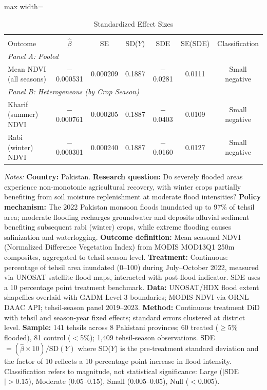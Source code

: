 \begin{table}[htbp]
\centering
\caption{Standardized Effect Sizes}
\label{tab:sde}
\begin{adjustbox}{max width=\textwidth}
\begin{tabular}{lcccccc}
\hline\hline
\\[-1.8ex]
Outcome & $\hat{\beta}$ & SE & SD($Y$) & SDE & SE(SDE) & Classification \\
\hline
\multicolumn{7}{l}{\textit{Panel A: Pooled}} \\
Mean NDVI (all seasons) & $-$0.000531 & 0.000209 & 0.1887 & $-$0.0281 & 0.0111 & Small negative \\
\hline
\multicolumn{7}{l}{\textit{Panel B: Heterogeneous (by Crop Season)}} \\
Kharif (summer) NDVI & $-$0.000761 & 0.000205 & 0.1887 & $-$0.0403 & 0.0109 & Small negative \\
Rabi (winter) NDVI & $-$0.000301 & 0.000240 & 0.1887 & $-$0.0160 & 0.0127 & Small negative \\
\hline\hline
\end{tabular}
\end{adjustbox}
\par\vspace{0.3em}
\footnotesize
\textit{Notes:} \textbf{Country:} Pakistan. \textbf{Research question:} Do severely flooded areas experience non-monotonic agricultural recovery, with winter crops partially benefiting from soil moisture replenishment at moderate flood intensities? \textbf{Policy mechanism:} The 2022 Pakistan monsoon floods inundated up to 97\% of tehsil area; moderate flooding recharges groundwater and deposits alluvial sediment benefiting subsequent rabi (winter) crops, while extreme flooding causes salinization and waterlogging. \textbf{Outcome definition:} Mean seasonal NDVI (Normalized Difference Vegetation Index) from MODIS MOD13Q1 250m composites, aggregated to tehsil-season level. \textbf{Treatment:} Continuous: percentage of tehsil area inundated (0--100) during July--October 2022, measured via UNOSAT satellite flood maps, interacted with post-flood indicator. SDE uses a 10 percentage point treatment benchmark. \textbf{Data:} UNOSAT/HDX flood extent shapefiles overlaid with GADM Level 3 boundaries; MODIS NDVI via ORNL DAAC API; tehsil-season panel 2019--2023. \textbf{Method:} Continuous treatment DiD with tehsil and season-year fixed effects; standard errors clustered at district level. \textbf{Sample:} 141 tehsils across 8 Pakistani provinces; 60 treated ($\geq$5\% flooded), 81 control ($<$5\%); 1,409 tehsil-season observations. SDE $= (\hat{\beta} \times 10) / \text{SD}(Y)$ where SD($Y$) is the pre-treatment standard deviation and the factor of 10 reflects a 10 percentage point increase in flood intensity. Classification refers to magnitude, not statistical significance: Large ($|$SDE$| > 0.15$), Moderate ($0.05$--$0.15$), Small ($0.005$--$0.05$), Null ($< 0.005$).
\end{table}
